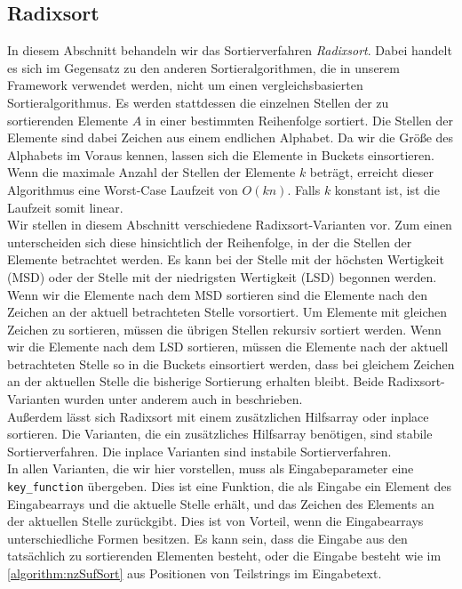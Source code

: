 \subsection{Radixsort}
\label{sort:radix}

In  diesem Abschnitt behandeln wir das Sortierverfahren \emph{Radixsort}. Dabei handelt es sich im Gegensatz zu den anderen Sortieralgorithmen, die in unserem Framework verwendet werden, nicht um einen vergleichsbasierten Sortieralgorithmus. Es werden stattdessen die einzelnen Stellen der zu sortierenden Elemente $A$ in einer bestimmten Reihenfolge sortiert. Die Stellen der Elemente sind dabei Zeichen aus einem endlichen Alphabet. Da wir die Größe des Alphabets im Voraus kennen, lassen sich die Elemente in Buckets einsortieren. Wenn die maximale Anzahl der Stellen der Elemente $k$ beträgt, erreicht dieser Algorithmus eine Worst-Case Laufzeit von $O(kn)$. Falls $k$ konstant ist, ist die Laufzeit somit linear. \\
Wir stellen in diesem Abschnitt verschiedene Radixsort-Varianten vor. Zum einen unterscheiden sich diese hinsichtlich der Reihenfolge, in der die Stellen der Elemente betrachtet werden. Es kann bei der Stelle mit der höchsten Wertigkeit (MSD) oder der Stelle mit der niedrigsten Wertigkeit (LSD) begonnen werden. Wenn wir die Elemente nach dem MSD sortieren sind die Elemente nach den Zeichen an der aktuell betrachteten Stelle vorsortiert. Um Elemente mit gleichen Zeichen zu sortieren, müssen die übrigen Stellen rekursiv sortiert werden. Wenn wir die Elemente nach dem LSD sortieren, müssen die Elemente nach der aktuell betrachteten Stelle so in die Buckets einsortiert werden, dass bei gleichem Zeichen an der aktuellen Stelle die bisherige Sortierung erhalten bleibt. Beide Radixsort-Varianten wurden unter anderem auch in \cite{Cormen2009} beschrieben. \\
Außerdem lässt sich Radixsort mit einem zusätzlichen Hilfsarray oder inplace sortieren. Die Varianten, die ein zusätzliches Hilfsarray benötigen, sind stabile Sortierverfahren. Die inplace Varianten sind instabile Sortierverfahren. \\
In allen Varianten, die wir hier vorstellen, muss als Eingabeparameter eine \texttt{key\_function} übergeben. Dies ist eine Funktion, die als Eingabe ein Element des Eingabearrays und die aktuelle Stelle erhält, und das Zeichen des Elements an der aktuellen Stelle zurückgibt. Dies ist von Vorteil, wenn die Eingabearrays unterschiedliche Formen besitzen. Es kann sein, dass die Eingabe aus den tatsächlich zu sortierenden Elementen besteht, oder die Eingabe besteht wie im \cref{algorithm:nzSufSort} aus Positionen von Teilstrings im Eingabetext. \\

